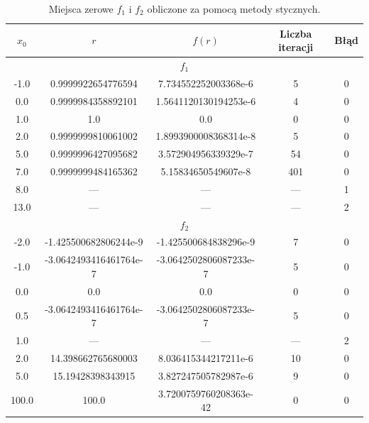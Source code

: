 \documentclass[10pt,a4paper, polish]{article}
\begin{document}
\begin{table}[H]
        \centering
        \footnotesize
\begin{tabular}{c|c|c|c|c}
$x_0$& {$r$} & {$f(r)$} & Liczba iteracji & Błąd \\ \hline
\multicolumn{5}{c}{$f_1$} \\ \hline
-1.0&0.9999922654776594&7.734552252003368e-6&5&0 \\
0.0&0.9999984358892101&1.5641120130194253e-6&4&0 \\
1.0&1.0&0.0&0&0 \\
2.0&0.9999999810061002&1.8993900008368314e-8&5&0 \\
5.0&0.9999996427095682&3.572904956339329e-7&54&0 \\
7.0&0.9999999484165362&5.15834650549607e-8&401&0 \\
8.0&{---}&{---}&{---}&1 \\
13.0&{---}&{---}&{---}&2 \\ \hline
\multicolumn{5}{c}{$f_2$} \\ \hline
-2.0&-1.425500682806244e-9&-1.425500684838296e-9&7&0 \\
-1.0&-3.0642493416461764e-7&-3.0642502806087233e-7&5&0 \\
0.0&0.0&0.0&0&0 \\
0.5&-3.0642493416461764e-7&-3.0642502806087233e-7&5&0 \\
1.0&{---}&{---}&{---}&2 \\
2.0&14.398662765680003&8.036415344217211e-6&10&0 \\
5.0&15.19428398343915&3.827247505782987e-6&9&0 \\
100.0&100.0&3.7200759760208363e-42&0&0 \\

\end{tabular}
\caption{Miejsca zerowe $f_1$ i $f_2$ obliczone za pomocą metody stycznych.}
\label{table:4}
\end{table}
\end{document}
